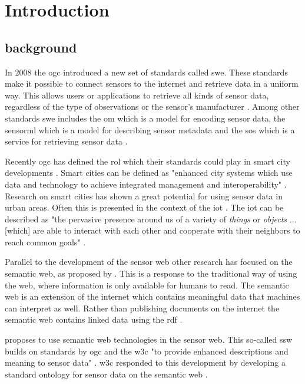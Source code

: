 
\chapter{Introduction}
\label{chap:introduction}

\section{background}
In 2008 the \ac{ogc} introduced a new set of standards called \ac{swe}. These standards make it possible to connect sensors to the internet and retrieve data in a uniform way. This allows users or applications to retrieve all kinds of sensor data, regardless of the type of observations or the sensor's manufacturer \citep{SW:Botts}. Among other standards \ac{swe} includes the \ac{om} which is a model for encoding sensor data, the \ac{sensorml} which is a model for describing sensor metadata and the \ac{sos} which is a service for retrieving sensor data \citep{SW:OGC}. 

Recently \ac{ogc} has defined the rol which their standards could play in smart city developments \citep{SC:OGC}. Smart cities can be defined as "enhanced city systems which use data and technology to achieve integrated management and interoperability" \citep[p. 18]{SC:Moir}. Research on smart cities has shown a great potential for using sensor data in urban areas. Often this is presented in the context of the \ac{iot} \citep{IOT:Zanelli, SSW:Perera}. The \ac{iot} can be described as "the pervasive presence around us of a variety of \textit{things} or \textit{objects} ... [which] are able to interact with each other and cooperate with their neighbors to reach common goals" \cite[p. 2787]{IOT:Atzori}. 

Parallel to the development of the sensor web other research has focused on the semantic web, as proposed by \cite{LD:Berners-lee}. This is a response to the traditional way of using the web, where information is only available for humans to read. The semantic web is an extension of the internet which contains meaningful data that machines can interpret as well. Rather than publishing documents on the internet the semantic web contains linked data using the \ac{rdf} \citep{LD:Bizer}.    

\cite{SSW:Sheth} proposes to use semantic web technologies in the sensor web. This so-called \ac{ssw} builds on standards by \ac{ogc} and the \ac{w3c} "to provide enhanced descriptions and meaning to sensor data" \cite[p.78]{SSW:Sheth}. \ac{w3c} responded to this development by developing a standard ontology for sensor data on the semantic web \citep{SSW:SSN_incubatorGroup}. \\
 
